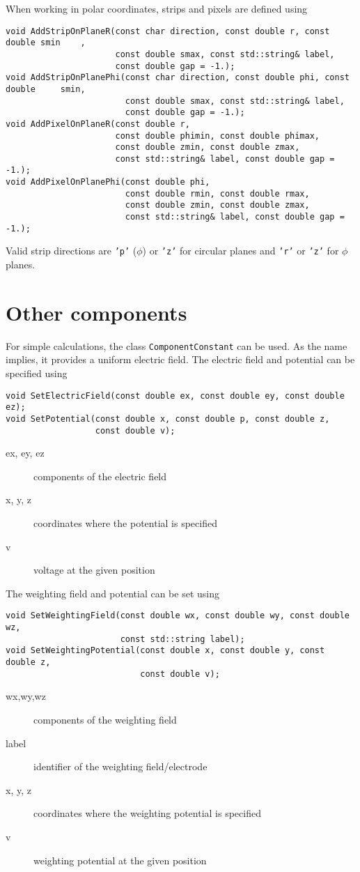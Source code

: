 When working in polar coordinates, strips and pixels are defined using
\begin{lstlisting}
void AddStripOnPlaneR(const char direction, const double r, const double smin    ,
                      const double smax, const std::string& label,
                      const double gap = -1.);
void AddStripOnPlanePhi(const char direction, const double phi, const double     smin,
                        const double smax, const std::string& label,
                        const double gap = -1.);
void AddPixelOnPlaneR(const double r,
                      const double phimin, const double phimax,
                      const double zmin, const double zmax,
                      const std::string& label, const double gap = -1.);
void AddPixelOnPlanePhi(const double phi,
                        const double rmin, const double rmax,
                        const double zmin, const double zmax,
                        const std::string& label, const double gap = -1.);
\end{lstlisting} 
Valid strip directions are \texttt{'p'} ($\phi$) or \texttt{'z'} for 
circular planes and \texttt{'r'} or \texttt{'z'} for $\phi$ planes.

\section{Other components}

For simple calculations, the class \texttt{ComponentConstant} can be used. 
As the name implies, it provides a uniform electric field. 
The electric field and potential can be specified using
\begin{lstlisting}
void SetElectricField(const double ex, const double ey, const double ez);
void SetPotential(const double x, const double p, const double z,
                  const double v);
\end{lstlisting}
\begin{description}
  \item[ex, ey, ez]
  components of the electric field
  \item[x, y, z]
  coordinates where the potential is specified
  \item[v]
  voltage at the given position
\end{description}
The weighting field and potential can be set using
\begin{lstlisting}
void SetWeightingField(const double wx, const double wy, const double wz,
                       const std::string label);
void SetWeightingPotential(const double x, const double y, const double z,
                           const double v);
\end{lstlisting}
\begin{description}
  \item[wx,wy,wz] components of the weighting field
  \item[label] identifier of the weighting field/electrode
  \item[x, y, z] coordinates where the weighting potential is specified
  \item[v] weighting potential at the given position 
\end{description}

